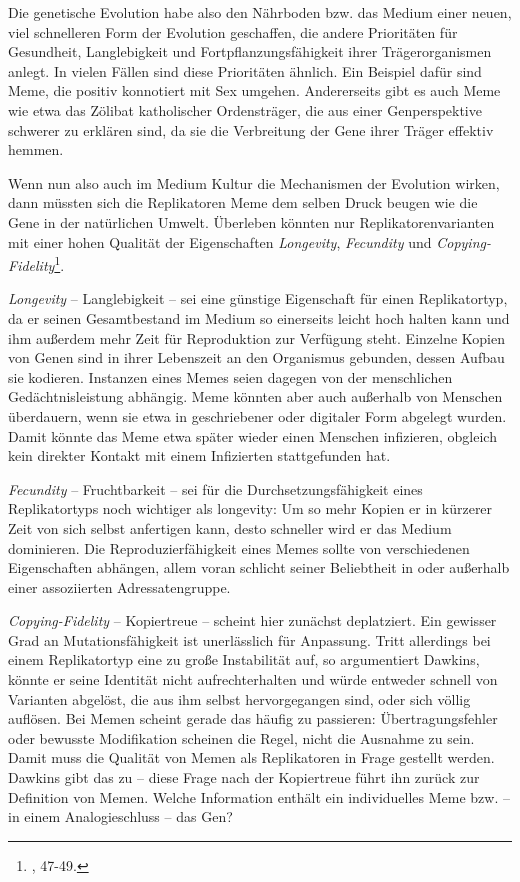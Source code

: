 \documentclass[openany,twoside,twocolumn]{book}
\let\rmarkdownfootnote\footnote%
\def\footnote{\protect\rmarkdownfootnote}
\begin{document}
Die genetische Evolution habe also den Nährboden bzw. das Medium einer
neuen, viel schnelleren Form der Evolution geschaffen, die andere
Prioritäten für Gesundheit, Langlebigkeit und Fortpflanzungsfähigkeit
ihrer Trägerorganismen anlegt. In vielen Fällen sind diese Prioritäten
ähnlich. Ein Beispiel dafür sind Meme, die positiv konnotiert mit Sex
umgehen. Andererseits gibt es auch Meme wie etwa das Zölibat
katholischer Ordensträger, die aus einer Genperspektive schwerer zu
erklären sind, da sie die Verbreitung der Gene ihrer Träger effektiv
hemmen.

Wenn nun also auch im Medium Kultur die Mechanismen der Evolution
wirken, dann müssten sich die Replikatoren Meme dem selben Druck beugen
wie die Gene in der natürlichen Umwelt. Überleben könnten nur
Replikatorenvarianten mit einer hohen Qualität der Eigenschaften
\emph{Longevity}, \emph{Fecundity} und \emph{Copying-Fidelity}\footnote{\textcite{Dawkinsselfishgene40th2016},
  47-49.}.

\emph{Longevity} -- Langlebigkeit -- sei eine günstige Eigenschaft für
einen Replikatortyp, da er seinen Gesamtbestand im Medium so einerseits
leicht hoch halten kann und ihm außerdem mehr Zeit für Reproduktion zur
Verfügung steht. Einzelne Kopien von Genen sind in ihrer Lebenszeit an
den Organismus gebunden, dessen Aufbau sie kodieren. Instanzen eines
Memes seien dagegen von der menschlichen Gedächtnisleistung abhängig.
Meme könnten aber auch außerhalb von Menschen überdauern, wenn sie etwa
in geschriebener oder digitaler Form abgelegt wurden. Damit könnte das
Meme etwa später wieder einen Menschen infizieren, obgleich kein
direkter Kontakt mit einem Infizierten stattgefunden hat.

\emph{Fecundity} -- Fruchtbarkeit -- sei für die Durchsetzungsfähigkeit
eines Replikatortyps noch wichtiger als longevity: Um so mehr Kopien er
in kürzerer Zeit von sich selbst anfertigen kann, desto schneller wird
er das Medium dominieren. Die Reproduzierfähigkeit eines Memes sollte
von verschiedenen Eigenschaften abhängen, allem voran schlicht seiner
Beliebtheit in oder außerhalb einer assoziierten Adressatengruppe.

\emph{Copying-Fidelity} -- Kopiertreue -- scheint hier zunächst
deplatziert. Ein gewisser Grad an Mutationsfähigkeit ist unerlässlich
für Anpassung. Tritt allerdings bei einem Replikatortyp eine zu große
Instabilität auf, so argumentiert Dawkins, könnte er seine Identität
nicht aufrechterhalten und würde entweder schnell von Varianten
abgelöst, die aus ihm selbst hervorgegangen sind, oder sich völlig
auflösen. Bei Memen scheint gerade das häufig zu passieren:
Übertragungsfehler oder bewusste Modifikation scheinen die Regel, nicht
die Ausnahme zu sein. Damit muss die Qualität von Memen als Replikatoren
in Frage gestellt werden. Dawkins gibt das zu -- diese Frage nach der
Kopiertreue führt ihn zurück zur Definition von Memen. Welche
Information enthält ein individuelles Meme bzw. -- in einem
Analogieschluss -- das Gen?
\end{document}
